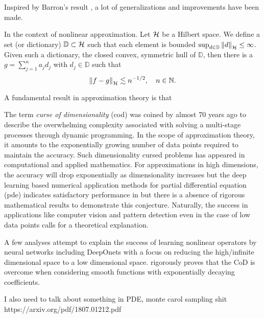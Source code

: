 Inspired by Barron's result \cite{eRepresentationFormulasPointwise2020,
carageaNeuralNetworkApproximation2022}, a lot of generalizations and
improvements have been made. 

In the context of nonlinear approximation. Let $\mathcal{H}$ be a Hilbert space. We
define a set (or dictionary) $\mathbb{D} \subset \mathcal{H}$ such that each
element is bounded $\sup_{d\in\mathbb{D}} \left\| d \right\|_{\mathcal{H}} \leq \infty$.
Given such a dictionary, the closed convex, symmetric hull of $\mathbb{D}$, then
there is a $g = \sum_{j=1}^n a_j d_j$ with $d_j \in \mathbb{D}$ such that
\begin{equation}
    \left\| f - g \right\|_{\mathcal{H}} \lesssim n^{-1/2}, \quad n \in \mathbb{N}.
\end{equation}

A fundamental result in approximation theory is that 

The term \textit{curse of dimensionality} (\gls{cod}) was coined by
\cite{bellmanTheoryDynamicProgramming1952} almost 70 years ago to describe the
overwhelming complexity associated with solving a multi-stage processes through
dynamic programming. In the scope of approximation theory, it amounts to the
exponentially growing number of data points required to maintain the accuracy.
Such dimensionality cursed problems has appeared in computational and applied
mathematics. For approximations in high dimensions, the accuracy will drop
exponentially as dimensionality increases but the deep learning based numerical
application methods for partial differential equation (\gls{pde}) indicates
satisfactory performance in \cite{eDeepRitzMethod2017,
eDeepLearningbasedNumerical2017,beckMachineLearningApproximation2019} but there
is a absence of rigorous mathematical results to demonstrate this conjecture.
Naturally, the success in applications like computer vision and pattern
detection even in the case of low data points calls for a theoretical
explanation.


 
A few analyses attempt to explain the success of learning nonlinear operators by
neural networks including DeepOnets with a focus on reducing the high/infinite
dimensional space to a low dimensional space.
\cite{lanthalerErrorEstimatesDeepOnets2022} rigorously proves that the CoD is
overcome when considering smooth functions with exponentially decaying
coefficients.

I also need to talk about something in PDE, monte carol sampling shit https://arxiv.org/pdf/1807.01212.pdf

